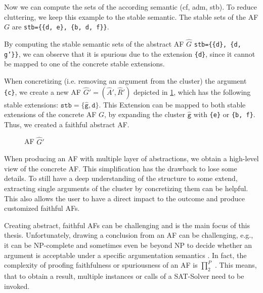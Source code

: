 Now we can compute the sets of the according semantic (cf, adm, stb). To reduce cluttering, we keep this example to the stable semantic. The stable sets of the AF $G$ are \texttt{stb=\{\{d, e\}, \{b, d, f\}\}}.

By computing the stable semantic sets of the abstract AF $\hat{G}$ \texttt{stb=\{\{d\}, \{d, g'\}\}}, we can observe that it is spurious due to the extension \texttt{\{d\}}, since it cannot be mapped to one of the concrete stable extensions.

When concretizing (i.e. removing an argument from the cluster) the argument \texttt{\{c\}}, we create a new AF $\hat{G}' = (\hat{A}', \hat{R}')$ depicted in \cref{af:introExample3}, which has the following stable extensions: $\mathtt{stb=\{\hat{g}, d\}}$. This Extension can be mapped to both stable extensions of the concrete AF $G$, by expanding the cluster $\mathtt{\hat{g}}$ with \texttt{\{e\}} or \texttt{\{b, f\}}. Thus, we created a faithful abstract AF.

\begin{figure}[h]
    \centering
    \caption{AF $\hat{G}'$}
    \label{af:introExample3}
\end{figure}


When producing an AF with multiple layer of abstractions, we obtain a high-level view of the concrete AF. This simplification has the drawback to lose some details. To still have a deep understanding of the structure to some extend, extracting single arguments of the cluster by concretizing them can be helpful. This also allows the user to have a direct impact to the outcome and produce customized faithful AFs.


Creating abstract, faithful AFs can be challenging and is the main focus of this thesis. Unfortunately, drawing a conclusion from an AF can be challenging, e.g., it can be NP-complete and sometimes even be beyond NP to decide whether an argument is acceptable under a specific argumentation semantics \cite{DBLP:journals/ai/DvorakGRW23}. In fact, the complexity of proofing faithfulness or spuriousness of an AF is $\prod_2^P$ \cite{DBLP:conf/kr/SaribaturW21}. This means, that to obtain a result, multiple instances or calls of a SAT-Solver need to be invoked.

